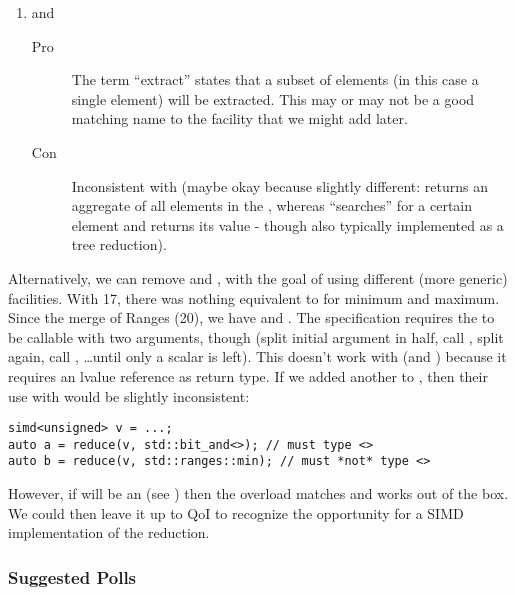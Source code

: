 \begin{enumerate}
  \item {} and 
    \begin{description}
      \item[Pro] The term “extract” states that a subset of elements (in this
        case a single element) will be extracted. This may or may not be a good
        matching name to the  facility that we might add later.
      \item[Con] Inconsistent with \std{} (maybe okay because
        slightly different: \std{} returns an
        aggregate of all elements in the \simd, whereas 
        “searches” for a certain element and returns its value - though also
        typically implemented as a tree reduction).
    \end{description}
\end{enumerate}

Alternatively, we can remove  and , with the goal of
using different (more generic) facilities.
With \CC{}17, there was nothing equivalent to \std{} for minimum
and maximum.
Since the merge of Ranges (\CC{}20), we have \stdranges{} and
\stdranges{}.
The  specification requires the  to be
callable with two  arguments, though (split initial argument in
half, call , split again, call , \ldots until
only a scalar is left).
This doesn't work with \stdranges{} (and ) because it
requires an lvalue reference as return type.
If we added another  to \stdranges{}, then their
use with  would be slightly inconsistent:
\medskip\begin{lstlisting}
simd<unsigned> v = ...;
auto a = reduce(v, std::bit_and<>); // must type <>
auto b = reduce(v, std::ranges::min); // must *not* type <>
\end{lstlisting}

However, if  will be an  (see )
then the
\stdranges{} overload matches and \stdranges{} works out of
the box.
We could then leave it up to QoI to recognize the opportunity for a SIMD
implementation of the reduction.

\subsubsection{Suggested Polls}

